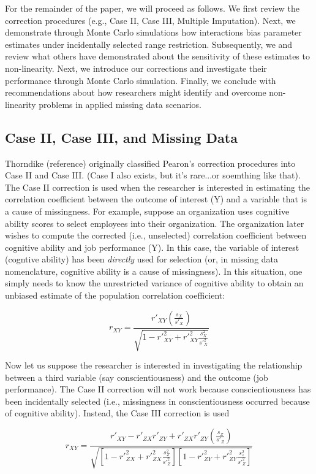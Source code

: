 \documentclass[doc, babel,english]{apa}%
\begin{document}
For the remainder of the paper, we will proceed as follows. We first review the correction procedures (e.g., Case II, Case III, Multiple Imputation). Next, we demonstrate through Monte Carlo simulations how interactions bias parameter estimates under incidentally selected range restriction. Subsequently, we and review what others have demonstrated about the sensitivity of these estimates to non-linearity. Next, we introduce our corrections and investigate their performance through Monte Carlo simulation. Finally, we conclude with recommendations about how researchers might identify and overcome non-linearity problems in applied missing data scenarios. 

\subsection{Case II, Case III, and Missing Data}
Thorndike (reference) originally classified Pearon's correction procedures into Case II and Case III. (Case I also exists, but it's rare...or soemthing like that). The Case II correction is used when the researcher is interested in estimating the correlation coefficient between the outcome of interest (Y) and a variable that is a cause of missingness. For example, suppose an organization uses cognitive ability scores to select employees into their organization. The organization later wishes to compute the corrected (i.e., unselected) correlation coefficient between cognitive ability and job performance (Y). In this case, the variable of interest (cogntive ability) has been \emph{directly} used for selection (or, in missing data nomenclature, cognitive ability is a cause of missingness). In this situation, one simply needs to know the unrestricted variance of cognitive ability to obtain an unbiased estimate of the population correlation coefficient:

\begin{equation}
\label{eq:II}
r_{XY} = \frac{r'_{XY}(\frac{s_X}{s'_X})}{\sqrt{1-r'^2_{XY} + r'^2_{XY}\frac{s^2_X}{s'^2_X}}}
\end{equation}

Now let us suppose the researcher is interested in investigating the relationship between a third variable (say conscientiousness) and the outcome (job performance). The Case II correction will not work because conscientiousness has been incidentally selected (i.e., missingness in conscientiousness occurred because of cognitive ability). Instead, the Case III correction is used 

\begin{equation}
\label{eq:III}
r_{XY} = \frac{r'_{XY}-r'_{ZX}r'_{ZY} + r'_{ZX}r'_{ZY}(\frac{s_Z}{s'_Z})}{\sqrt{[1-r'^2_{ZX} + r'^2_{ZX}\frac{s^2_Z}{s'^2_Z}][1-r'^2_{ZY} + r'^2_{ZY}\frac{s^2_z}{s'^2_Z}]}}
\end{equation}
\end{document}
